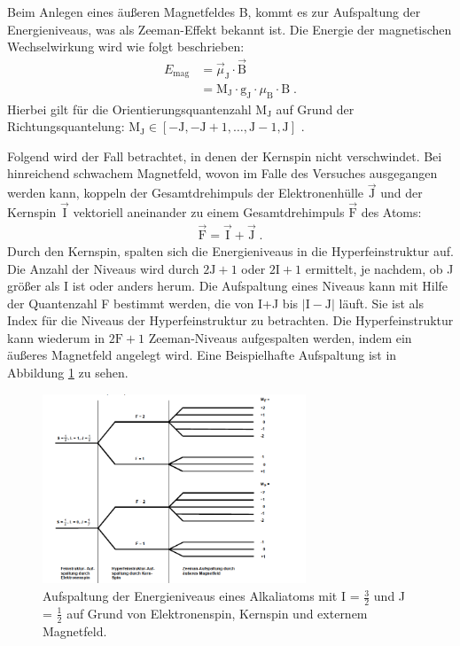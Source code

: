 Beim Anlegen eines äußeren Magnetfeldes B, kommt es zur Aufspaltung der Energieniveaus, was als Zeeman-Effekt bekannt ist. Die Energie der magnetischen Wechselwirkung wird wie folgt beschrieben:
\begin{align}
    E_{\text{mag}} &= \vec{\mu}_{\text{J}} \cdot \vec{\text{B}} \\
    &= \text{M}_\text{J} \cdot \text{g}_\text{J} \cdot \mu_{\text{B}} \cdot \text{B} \; .
    \label{eq:E_mag}
\end{align}
Hierbei gilt für die Orientierungsquantenzahl $\text{M}_\text{J}$ auf Grund der Richtungsquantelung: $\text{M}_{\text{J}} \in [-\text{J}, -\text{J}+1,\hdots,\text{J}-1,\text{J}]$ .

\noindent Folgend wird der Fall betrachtet, in denen der Kernspin nicht verschwindet.
Bei hinreichend schwachem Magnetfeld, wovon im Falle des Versuches ausgegangen werden kann, koppeln der Gesamtdrehimpuls der Elektronenhülle $\vec{\text{J}}$ und der Kernspin $\vec{\text{I}}$ vektoriell aneinander zu einem Gesamtdrehimpuls $\vec{\text{F}}$ des Atoms:
\begin{align*}
    \vec{\text{F}} = \vec{\text{I}} + \vec{\text{J}} \; .
\end{align*}
Durch den Kernspin, spalten sich die Energieniveaus in die Hyperfeinstruktur auf.
Die Anzahl der Niveaus wird durch $2\text{J}+1$ oder $2\text{I}+1$ ermittelt, je nachdem, ob J größer als I ist oder anders herum.
Die Aufspaltung eines Niveaus kann mit Hilfe der Quantenzahl F bestimmt werden, die von I+J bis $|\text{I}-\text{J}|$ läuft. Sie ist als Index für die Niveaus der Hyperfeinstruktur zu betrachten.
Die Hyperfeinstruktur kann wiederum in $2\text{F}+1$ Zeeman-Niveaus aufgespalten werden, indem ein äußeres Magnetfeld angelegt wird.
Eine Beispielhafte Aufspaltung ist in Abbildung \ref{abb:Aufspaltung} zu sehen.
\FloatBarrier
\begin{figure}
    \centering
    \includegraphics[width=0.7\textwidth]{Aufspaltung.PNG}
    \caption{Aufspaltung der Energieniveaus eines Alkaliatoms mit I = $\frac{3}{2}$ und J = $\frac{1}{2}$ auf Grund von Elektronenspin, Kernspin und externem Magnetfeld. \cite{Q1}}
    \label{abb:Aufspaltung}
\end{figure}

